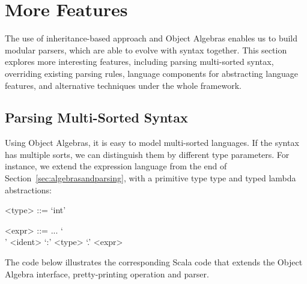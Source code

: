 \vspace{-3pt}
\section{More Features}

The use of inheritance-based approach and Object Algebras enables us
to build modular parsers, which are able to evolve with
syntax together. This section explores more interesting features, including
parsing multi-sorted syntax, overriding existing parsing rules,
language components for abstracting language features, and alternative
techniques under the whole framework.

\vspace{-2pt}
\subsection{Parsing Multi-Sorted Syntax}\label{subsec:differentsyntax}

\begin{comment}
As illustrated above, using Object Algebras separates data structures from behaviors, thus enabling more modularity and reuse. New language constructs correspond to the new cases in the algebra. Different operations
 on structures, with both code reuse and separate compilation supported.
\end{comment}

Using Object Algebras, it is easy to
model multi-sorted languages. If the syntax has multiple sorts, we can distinguish them by different type parameters.
For instance, we extend the expression language from the end of Section~\ref{sec:algebrasandparsing}, with a
primitive type  type and typed lambda abstractions:

\vspace{-2pt}
\setlength{\grammarindent}{5em}
\begin{grammar}
<type> ::= `int'

<expr> ::=  ... \alt `\\' <ident> `:' <type> `.' <expr>
\end{grammar}
\vspace{-2pt}

The code below illustrates the corresponding Scala code
that extends the Object Algebra interface, pretty-printing operation and parser.

\vspace{-4pt}
\vspace{-4pt}

